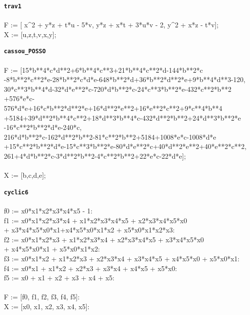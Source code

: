 \documentclass[letterpaper,12pt,titlepage,oneside,final]{book}
\newenvironment{codefont}{\footnotesize\ttfamily}{\par}
\begin{document}
\begin{appendices}
\noindent\textbf{\texttt{trav1}}\\\\
\noindent\begin{codefont}
 F := [ x\^{}2 + y*z + t*u - 5*v, y*z + x*t + 3*u*v - 2, y\^{}2 + x*z - t*v];\\
X := [u,z,t,v,x,y];\\
\end{codefont}

\noindent\textbf{\texttt{cassou\_POSSO}}\\\\
\noindent\begin{codefont}
 F := [15*b**4*c*d**2+6*b**4*c**3+21*b**4*c**2*d-144*b**2*c\\
-8*b**2*c**2*e-28*b**2*c*d*e-648*b**2*d+36*b**2*d**2*e+9*b**4*d**3-120,\\
30*c**3*b**4*d-32*d*e**2*c-720*d*b**2*c-24*c**3*b**2*e-432*c**2*b**2\\
+576*e*c-576*d*e+16*c*b**2*d**2*e+16*d**2*e**2+16*e**2*c**2+9*c**4*b**4\\
+5184+39*d**2*b**4*c**2+18*d**3*b**4*c-432*d**2*b**2+24*d**3*b**2*e\\-16*c**2*b**2*d*e-240*c,\\
216*d*b**2*c-162*d**2*b**2-81*c**2*b**2+5184+1008*e*c-1008*d*e\\
+15*c**2*b**2*d*e-15*c**3*b**2*e-80*d*e**2*c+40*d**2*e**2+40*e**2*c**2,\\
261+4*d*b**2*c-3*d**2*b**2-4*c**2*b**2+22*e*c-22*d*e];\\
\\
X := [b,c,d,e];\\
\end{codefont}

\noindent\textbf{\texttt{cyclic6}}\\\\
\noindent\begin{codefont}
 f0 := x0*x1*x2*x3*x4*x5 - 1:
\\
f1 := x0*x1*x2*x3*x4 + x1*x2*x3*x4*x5 + x2*x3*x4*x5*x0 \\
+ x3*x4*x5*x0*x1+x4*x5*x0*x1*x2 + x5*x0*x1*x2*x3:
\\
f2 := x0*x1*x2*x3 + x1*x2*x3*x4 + x2*x3*x4*x5 + x3*x4*x5*x0 \\
+ x4*x5*x0*x1 + x5*x0*x1*x2:
\\
f3 := x0*x1*x2 + x1*x2*x3 + x2*x3*x4 + x3*x4*x5 + x4*x5*x0 + x5*x0*x1:
\\
f4 := x0*x1 + x1*x2 + x2*x3 + x3*x4 + x4*x5 + x5*x0:
\\
f5 := x0 + x1 + x2 + x3 + x4 + x5:
\\
\\
F := [f0, f1, f2, f3, f4, f5]:
\\
X := [x0, x1, x2, x3, x4, x5]:\\
\end{codefont}


\end{appendices}
\end{document}
